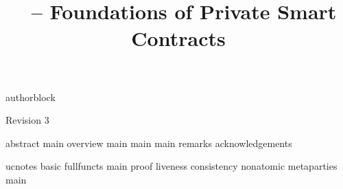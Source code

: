 \usepackage{packages}
\usepackage{contract}
\usepackage{notation}
\graphicspath{{fig/}}
\makeatletter
\newif\iffull\fulltrue
\makeatother
{authorblock}
\title{\kachina\ -- Foundations of Private Smart Contracts}


\let\oldaddcontentsline\addcontentsline
\def\addcontentsline#1#2#3{}
\maketitle
\def\addcontentsline#1#2#3{\oldaddcontentsline{#1}{#2}{#3}}
\begin{center}\footnotesize Revision 3\end{center}
\todosum

\begingroup
\renewcommand\thefootnote{\fnsymbol{footnote}}%
\renewcommand\thempfootnote{\fnsymbol{mpfootnote}}%
%
\endgroup
{abstract}
\starttoc
{main}
{overview}
{main}
{main}
{main}
{remarks}
{acknowledgements}

{}
{}


\iffull
\startappendix
{ucnotes}
{basic}
{fullfuncts}
{main}
{proof}
{liveness}
{consistency}
{nonatomic}
{metaparties}
{main}
\fi



